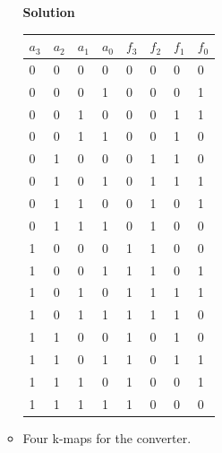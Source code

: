 \begin{enumerate}
\begin{itemize}
                \begin{onlysolution}  \textbf{Solution} \itshape{
                        \begin{tabular}{l|l|l|l||l|l|l|l}
                            $a_3$ & $a_2$ & $a_1$ & $a_0$ & $f_3$ & $f_2$ & $f_1$ & $f_0$ \\ \hline
                            0&0&0&0 &0&0&0&0 \\ \hline
                            0&0&0&1 &0&0&0&1 \\ \hline
                            0&0&1&0 &0&0&1&1 \\ \hline
                            0&0&1&1 &0&0&1&0 \\ \hline
                            0&1&0&0 &0&1&1&0 \\ \hline
                            0&1&0&1 &0&1&1&1 \\ \hline
                            0&1&1&0 &0&1&0&1 \\ \hline
                            0&1&1&1 &0&1&0&0 \\ \hline
                            1&0&0&0 &1&1&0&0 \\ \hline
                            1&0&0&1 &1&1&0&1 \\ \hline
                            1&0&1&0 &1&1&1&1 \\ \hline
                            1&0&1&1 &1&1&1&0 \\ \hline
                            1&1&0&0 &1&0&1&0 \\ \hline
                            1&1&0&1 &1&0&1&1 \\ \hline
                            1&1&1&0 &1&0&0&1 \\ \hline
                            1&1&1&1 &1&0&0&0 \\
                        \end{tabular}
                    }
                \end{onlysolution}

            \item Four k-maps for the converter.


\end{itemize}
\end{enumerate}
